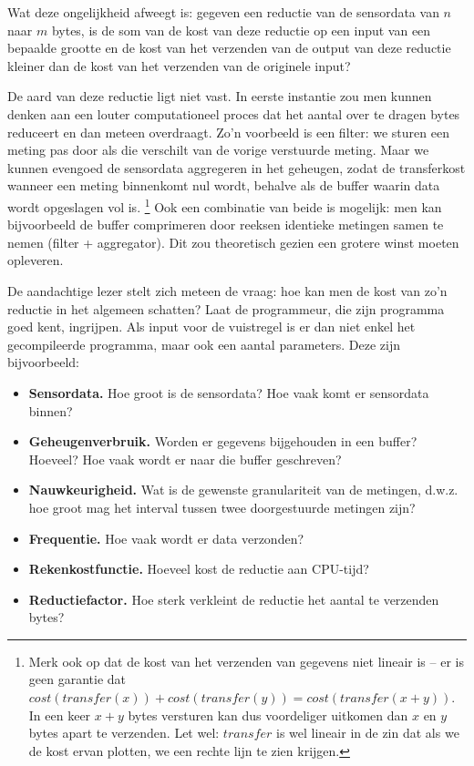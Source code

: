 \documentclass[11pt]{article}
\begin{document}
Wat deze ongelijkheid afweegt is: gegeven een reductie van de sensordata van $n$ naar
$m$ bytes, is de som van de kost van deze reductie op een input van een bepaalde
grootte en de kost van het verzenden van de output van deze reductie kleiner dan
de kost van het verzenden van de originele input?

De aard van deze reductie ligt niet vast. In eerste instantie zou men kunnen
denken aan een louter computationeel proces dat het aantal over te dragen bytes
reduceert en dan meteen overdraagt. Zo'n voorbeeld is een filter: we sturen een
meting pas door als die verschilt van de vorige verstuurde meting. Maar we
kunnen evengoed de sensordata aggregeren in het geheugen, zodat de transferkost
wanneer een meting binnenkomt nul wordt, behalve als de buffer waarin data wordt
opgeslagen vol is. \footnote{Merk ook op dat de kost van het verzenden van gegevens
niet lineair is -- er is geen garantie dat $cost(transfer(x)) +
cost(transfer(y)) = cost(transfer(x + y))$. In een keer $x + y$ bytes versturen
kan dus voordeliger uitkomen dan $x$ en $y$ bytes apart te verzenden. Let wel: $transfer$ is wel lineair in de zin dat als we de kost ervan plotten, we een rechte lijn te zien krijgen. } 
Ook een combinatie van beide is mogelijk: men kan bijvoorbeeld de buffer
comprimeren door reeksen identieke metingen samen te nemen (filter +
aggregator). Dit zou theoretisch gezien een grotere winst moeten opleveren.

De aandachtige lezer stelt zich meteen de vraag: hoe kan men de kost van zo'n
reductie in het algemeen schatten? Laat de programmeur, die zijn programma goed
kent, ingrijpen. Als input voor de vuistregel is er dan niet enkel het
gecompileerde programma, maar ook een aantal parameters. Deze zijn bijvoorbeeld:

\begin{itemize}
\item \textbf{Sensordata.} Hoe groot is de sensordata? Hoe vaak komt er sensordata binnen?
\item \textbf{Geheugenverbruik.} Worden er gegevens bijgehouden in een buffer? Hoeveel? Hoe vaak wordt er naar die buffer geschreven?
\item \textbf{Nauwkeurigheid.} Wat is de gewenste granulariteit van de metingen, d.w.z. hoe groot mag het interval tussen twee doorgestuurde metingen zijn?
\item \textbf{Frequentie.} Hoe vaak wordt er data verzonden?
\item \textbf{Rekenkostfunctie.} Hoeveel kost de reductie aan CPU-tijd?
\item \textbf{Reductiefactor.} Hoe sterk verkleint de reductie het aantal te verzenden bytes?
\end{itemize}
\end{document}
